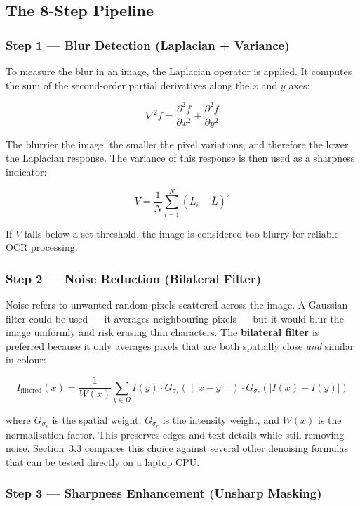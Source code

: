 \documentclass[12pt, a4paper]{article}
\begin{document}
\subsection{The 8-Step Pipeline}

\subsubsection*{Step 1 --- Blur Detection (Laplacian + Variance)}

To measure the blur in an image, the Laplacian operator is applied. It computes the sum of the second-order partial derivatives along the $x$ and $y$ axes:

\[
\nabla^2 f = \frac{\partial^2 f}{\partial x^2} + \frac{\partial^2 f}{\partial y^2}
\]

The blurrier the image, the smaller the pixel variations, and therefore the lower the Laplacian response. The variance of this response is then used as a sharpness indicator:

\[
V = \frac{1}{N} \sum_{i=1}^{N} \left( L_i - \bar{L} \right)^2
\]

If $V$ falls below a set threshold, the image is considered too blurry for reliable OCR processing.

\subsubsection*{Step 2 --- Noise Reduction (Bilateral Filter)}

Noise refers to unwanted random pixels scattered across the image. A Gaussian filter could be used --- it averages neighbouring pixels --- but it would blur the image uniformly and risk erasing thin characters. The \textbf{bilateral filter} is preferred because it only averages pixels that are both spatially close \textit{and} similar in colour:

\[
I_{\text{filtered}}(x) = \frac{1}{W(x)} \sum_{y \in \Omega} I(y) \cdot G_{\sigma_s}(\|x - y\|) \cdot G_{\sigma_r}(|I(x) - I(y)|)
\]

where $G_{\sigma_s}$ is the spatial weight, $G_{\sigma_r}$ is the intensity weight, and $W(x)$ is the normalisation factor. This preserves edges and text details while still removing noise. Section~3.3 compares this choice against several other denoising formulas that can be tested directly on a laptop CPU.

\subsubsection*{Step 3 --- Sharpness Enhancement (Unsharp Masking)}
\end{document}
